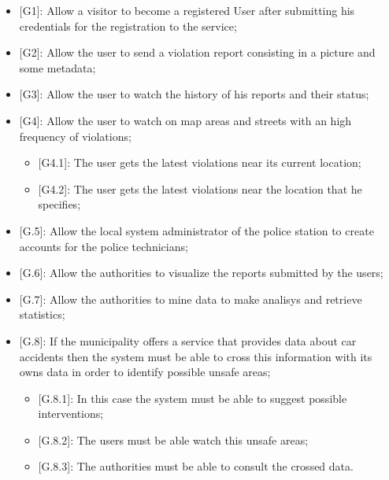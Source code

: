 \begin{itemize}
  \item {[G1]}: Allow a visitor to become a registered User after submitting his credentials for the registration to the service;
  \item {[G2]}: Allow the user to send a violation report consisting in a picture and some metadata;
  \item {[G3]}: Allow the user to watch the history of his reports and their status;
  \item {[G4]}: Allow the user to watch on map areas and streets with an high frequency of violations;
  \begin{itemize}
    \item {[G4.1]}: The user gets the latest violations near its current location;
    \item {[G4.2]}: The user gets the latest violations near the location that he specifies;
  \end{itemize} 
  \item {[G.5]}: Allow the local system administrator of the police station to create accounts for the police technicians;
  \item {[G.6]}: Allow the authorities to visualize the reports submitted by the users;
  \item {[G.7]}: Allow the authorities to mine data to make analisys and retrieve statistics;
  \item {[G.8]}: If the municipality offers a service that provides data about car accidents then the system must be able to cross this information with its owns data in order to identify possible unsafe areas;
  \begin{itemize}
    \item {[G.8.1]}: In this case the system must be able to suggest possible interventions;
    \item {[G.8.2]}: The users must be able watch this unsafe areas;
    \item {[G.8.3]}: The authorities must be able to consult the crossed data.
  \end{itemize} 
\end{itemize}
